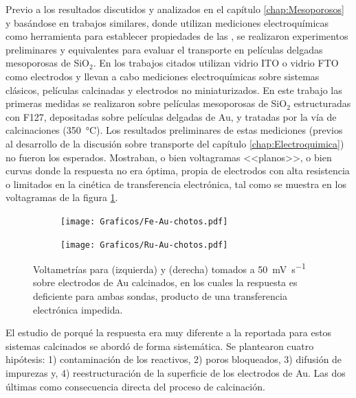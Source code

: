   			Previo a los resultados discutidos y analizados en el capítulo \ref{chap:Mesoporosos} y basándose en trabajos similares\cite{Otal2006,Calvo2009,Fattakhova-Rohlfing2007,Rohlfing2005}, donde utilizan mediciones electroquímicas como herramienta para establecer propiedades de las \pdm, se realizaron experimentos preliminares y equivalentes para evaluar el transporte en películas delgadas mesoporosas de SiO$_2$. En los trabajos citados utilizan vidrio ITO o vidrio FTO como electrodos y llevan a cabo mediciones electroquímicas sobre sistemas clásicos, películas calcinadas y electrodos no miniaturizados. En este trabajo las primeras medidas se realizaron sobre películas mesoporosas de SiO$_2$ estructuradas con F127, depositadas sobre películas delgadas de Au, y tratadas por la vía de calcinaciones (\SI{350}{\celsius}). Los resultados preliminares de estas mediciones (previos al desarrollo de la discusión sobre transporte del capítulo \ref{chap:Electroquimica}) no fueron los esperados. Mostraban, o bien voltagramas <<planos>>, o bien curvas donde la respuesta no era óptima, propia de electrodos con alta resistencia o limitados en la cinética de transferencia electrónica, tal como se muestra en los voltagramas de la figura \ref{fig:volta_chotos}.

  				\begin{figure}[ht]
		 	      \begin{subfigure}[t]{0.495\textwidth}
		          	\texttt{[image: Graficos/Fe-Au-chotos.pdf]}
		      		\end{subfigure}
		      	 \begin{subfigure}[t]{0.495\textwidth}
		          	\texttt{[image: Graficos/Ru-Au-chotos.pdf]}
		 			\end{subfigure}
		      	 \caption{Voltametrías para \ferroferri\space (izquierda) y \aminorutenio\space (derecha) tomados a \SI{50}{\milli\volt\per\second} sobre electrodos de Au calcinados, en los cuales la respuesta es deficiente para ambas sondas, producto de una transferencia electrónica impedida.}
		      	 \label{fig:volta_chotos}
	      		 \end{figure}	

  			 \vspace*{2mm}El estudio de porqué la respuesta era muy diferente a la reportada para estos sistemas calcinados se abordó de forma sistemática. Se plantearon cuatro hipótesis: 1) contaminación de los reactivos, 2) poros bloqueados, 3) difusión de impurezas y, 4) reestructuración de la superficie de los electrodos de Au. Las dos últimas como consecuencia directa del proceso de calcinación.


